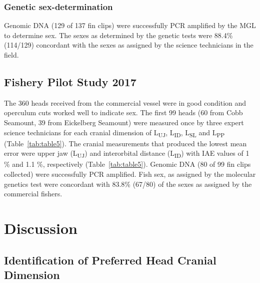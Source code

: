 \documentclass[12pt]{article}\usepackage[]{graphicx}\usepackage[]{color}
\begin{document}
\hypertarget{genetic-sex-determination}{%
\subsubsection{Genetic sex-determination}\label{genetic-sex-determination}}

Genomic DNA (129 of 137 fin clips) were successfully PCR amplified by the MGL to determine sex. The sexes as determined by the genetic tests were 88.4\% (114/129) concordant with the sexes as assigned by the science technicians in the field.

\hypertarget{fishery-pilot-study-2017-1}{%
\subsection{Fishery Pilot Study 2017}\label{fishery-pilot-study-2017-1}}

The 360 heads received from the commercial vessel were in good condition and operculum cuts worked well to indicate sex. The first 99 heads (60 from Cobb Seamount, 39 from Eickelberg Seamount) were measured once by three expert science technicians for each cranial dimension of L\textsubscript{UJ}, L\textsubscript{ID}, L\textsubscript{SL} and L\textsubscript{PP} (Table~\ref{tab:table5}). The cranial measurements that produced the lowest mean error were upper jaw (L\textsubscript{UJ}) and interorbital distance (L\textsubscript{ID}) with IAE values of 1 \% and 1.1 \%, respectively (Table~\ref{tab:table5}). Genomic DNA (80 of 99 fin clips collected) were successfully PCR amplified. Fish sex, as assigned by the molecular genetics test were concordant with 83.8\% (67/80) of the sexes as assigned by the commercial fishers.

\hypertarget{discussion}{%
\section{Discussion}\label{discussion}}

\hypertarget{identification-of-preferred-head-cranial-dimension}{%
\subsection{Identification of Preferred Head Cranial Dimension}\label{identification-of-preferred-head-cranial-dimension}}
\end{document}
